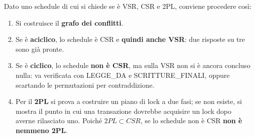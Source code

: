 \documentclass[a4paper,twoside]{article}
\begin{document}
\begin{define}
  Dato uno schedule di cui si chiede se è VSR, CSR e 2PL, conviene procedere così:
  \begin{enumerate}
    \item Si costruisce il \textbf{grafo dei conflitti}.
    \item Se è \textbf{aciclico}, lo schedule è CSR e \textbf{quindi anche VSR}: due
      risposte su tre sono già pronte.
    \item Se è \textbf{ciclico}, lo schedule \textbf{non è CSR}, ma sulla VSR non si è
      ancora concluso nulla: va verificata con LEGGE\_DA e SCRITTURE\_FINALI, oppure
      scartando le permutazioni per contraddizione.
    \item Per il \textbf{2PL} si prova a costruire un piano di lock a due fasi; se non
      esiste, si mostra il punto in cui una transazione dovrebbe acquisire un lock dopo
      averne rilasciato uno. Poiché \( 2PL \subset CSR \), se lo schedule non è CSR
      \textbf{non è nemmeno 2PL}.
  \end{enumerate}
\end{define}
\end{document}
